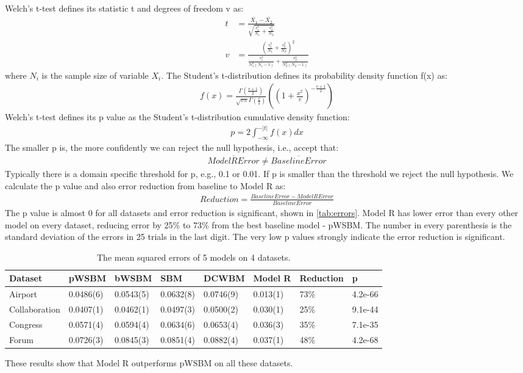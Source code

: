 \documentclass[conference]{IEEEtran}
\begin{document}
Welch's t-test defines its statistic t and degrees of freedom v as:
\begin{align*}
	t &= \frac{
		\overline{X_1} - \overline{X_2}
		}{
		\sqrt{\frac{s^2_1}{N_1} + \frac{s^2_2}{N_2}}
		}\\
	v &= \frac{
		(\frac{s^2_1}{N_1} + \frac{s^2_2}{N_2})^2
		}{
		\frac{s^4_1}{N_1^2(N_1-1)} + \frac{s^4_2}{N_2^2(N_2-1)}
		}
\end{align*}
where $ N_i $ is the sample size of variable $ X_i $.
The Student's t-distribution defines its probability density function f(x) as:
\begin{align*}
f(x) = \frac{\Gamma(\frac{v+1}{2})}{\sqrt{v\pi}\Gamma(\frac{v}{2})}
((1+\frac{x^2}{v})^{-\frac{v+1}{2}})
\end{align*}
Welch's t-test defines its p value as the Student's t-distribution cumulative density function:
\begin{align*}
p = 2 \int_{-\infty}^{-|t|} f(x) dx
\end{align*}
The smaller p is, the more confidently we can reject the null hypothesis, i.e., accept that:
\begin{align*}
\overline{ModelRError} \neq \overline{BaselineError}
\end{align*}
Typically there is a domain specific threshold for p, e.g., 0.1 or 0.01. If p is smaller than the threshold we reject the null hypothesis.
We calculate the p value and also error reduction from baseline to Model R as:
\begin{align*}
Reduction = \frac{BaselineError - ModelRError}{BaselineError}
\end{align*}
The p value is almost 0 for all datasets and error reduction is significant,
shown in \autoref{tab:errors}.
Model R has lower error than every other model on every dataset,
reducing error by 25\% to 73\% from the best baseline model - pWSBM.
The number in every parenthesis is the standard deviation of the errors in 25 trials in the last digit. The very low p values strongly indicate the error reduction is significant.
\begin{table}[!htb]\centering
	\caption{
		The mean squared errors of 5 models on 4 datasets.
	}
	\begin{tabularx}{\textwidth}{|X|X|X|X|X|X|X|X|} \hline \rowcolor{blue!40}
		Dataset & pWSBM & bWSBM & SBM & DCWBM & Model R & Reduction & p \\ \hline
		Airport & 0.0486(6) & 0.0543(5) & 0.0632(8) & 0.0746(9) & 0.013(1) & 73\% & 4.2e-66 \\ \hline
		Collaboration & 0.0407(1) & 0.0462(1) & 0.0497(3) & 0.0500(2) & 0.030(1) & 25\% & 9.1e-44 \\ \hline
		Congress & 0.0571(4) & 0.0594(4) & 0.0634(6) & 0.0653(4) & 0.036(3) & 35\% & 7.1e-35 \\ \hline
		Forum & 0.0726(3) & 0.0845(3) & 0.0851(4) & 0.0882(4) & 0.037(1) & 48\% & 4.2e-68 \\ \hline
	\end{tabularx}
	\label{tab:errors}
\end{table}
These results show that Model R outperforms pWSBM on all these datasets.
\end{document}
